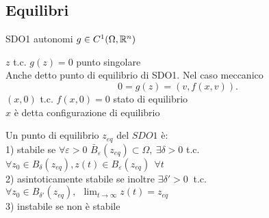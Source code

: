 \documentclass{article}
\begin{document}
	  \subsection{Equilibri}
	  SDO1 autonomi $g\in C^1(\Omega, \mathbb{R}^n)$\\
	   \begin{defi}
	  	$z$ t.c. $g(z) = 0$ punto singolare\\
		Anche detto punto di equilibrio di SDO1. Nel caso meccanico 
		 \[
		0 = g(z) = (v,f(x,v))
		.\] 
		$(x,0)$ t.c. $f(x,0) = 0$ stato di equilibrio\\
		 $x$ è detta configurazione di equilibrio
	  \end{defi}
	  \begin{defi}
		  Un punto di equilibrio $z_{eq}$ del $SDO1$ è:\\
		  1) stabile se  $\forall \varepsilon > 0 $  $\bar B_\varepsilon(z_{eq})\subset \Omega, \ \exists \delta > 0$ t.c. $\forall z_0\in B_\delta (z_{eq}), z(t)\in B_\varepsilon(z_{eq}) \ \ \forall t$ \\
		  2) asintoticamente stabile se inoltre $\exists \delta '>0 \ $ t.c.  $\forall z_0\in B_{\delta'}(z_{eq}), \ \ \lim_{t \rightarrow \infty} z(t) = z_{eq}$\\
		  3) instabile se non è stabile
	  \end{defi}


\maketitle
	\newpage
\end{document}
